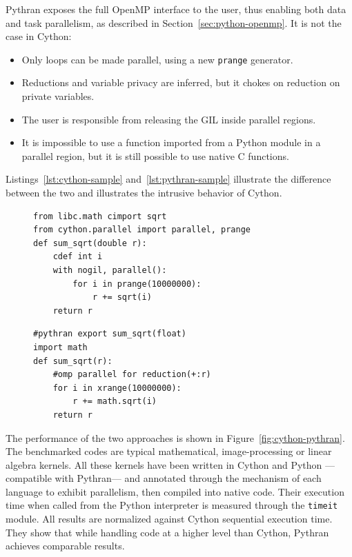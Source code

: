\documentclass[conference]{IEEEtran}
\begin{document}
Pythran exposes the full OpenMP interface to the user, thus enabling both data
and task parallelism, as described in Section~\ref{sec:python-openmp}. It is
not the case in Cython:
%
\begin{itemize}

    \item Only loops can be made parallel, using a new \texttt{prange} generator.

    \item Reductions and variable privacy are inferred, but it chokes on
        reduction on private variables.

    \item The user is responsible from releasing the GIL inside parallel
        regions.

    \item It is impossible to use a function imported from a Python module in a
        parallel region, but it is still possible to use native C functions.

\end{itemize}
%
Listings~\ref{lst:cython-sample} and~\ref{lst:pythran-sample} illustrate the
difference between the two and illustrates the intrusive behavior of Cython.

\begin{figure}

    \begin{lstlisting}[label={lst:cython-sample}, caption={Cython implementation
    of a parallel reduction.}]
from libc.math cimport sqrt
from cython.parallel import parallel, prange
def sum_sqrt(double r):
    cdef int i
    with nogil, parallel():
        for i in prange(10000000):
            r += sqrt(i)
    return r
    \end{lstlisting}
%
    \begin{lstlisting}[label={lst:pythran-sample}, caption={Pythran implementation
    of a parallel reduction.}]
#pythran export sum_sqrt(float)
import math
def sum_sqrt(r):
    #omp parallel for reduction(+:r)
    for i in xrange(10000000):
        r += math.sqrt(i)
    return r
    \end{lstlisting}
\end{figure}

The performance of the two approaches is shown in
Figure~\ref{fig:cython-pythran}.  The benchmarked codes are typical
mathematical, image-processing or linear algebra kernels. All these kernels have
been written in Cython and Python ---compatible with Pythran--- and annotated
through the mechanism of each language to exhibit parallelism, then compiled
into native code.  Their execution time when called from the Python interpreter
is measured through the \texttt{timeit} module. All results are normalized
against Cython sequential execution time. They show that while handling code at
a higher level than Cython, Pythran achieves comparable results.
\end{document}
